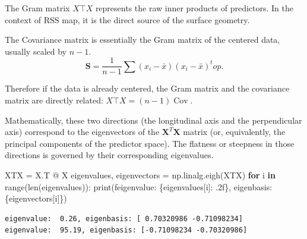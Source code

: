 \documentclass[
  letterpaper,
  DIV=11,
  numbers=noendperiod]{scrreprt}
\newenvironment{Shaded}{\begin{snugshade}}{\end{snugshade}}
\newcommand{\BuiltInTok}[1]{\textcolor[rgb]{0.00,0.23,0.31}{#1}}
\newcommand{\ControlFlowTok}[1]{\textcolor[rgb]{0.00,0.23,0.31}{\textbf{#1}}}
\newcommand{\KeywordTok}[1]{\textcolor[rgb]{0.00,0.23,0.31}{\textbf{#1}}}
\newcommand{\NormalTok}[1]{\textcolor[rgb]{0.00,0.23,0.31}{#1}}
\newcommand{\OperatorTok}[1]{\textcolor[rgb]{0.37,0.37,0.37}{#1}}
\newcommand{\SpecialCharTok}[1]{\textcolor[rgb]{0.37,0.37,0.37}{#1}}
\newcommand{\SpecialStringTok}[1]{\textcolor[rgb]{0.13,0.47,0.30}{#1}}
\newcommand{\rss}{\mathrm{RSS}}
\newcommand{\Cov}{\operatorname{Cov}}
\theoremstyle{definition}
\theoremstyle{definition}
\theoremstyle{plain}
\theoremstyle{plain}
\theoremstyle{remark}
\begin{document}
\begin{tcolorbox}[enhanced jigsaw, arc=.35mm, bottomrule=.15mm, bottomtitle=1mm, breakable, colback=white, colbacktitle=quarto-callout-note-color!10!white, colframe=quarto-callout-note-color-frame, coltitle=black, left=2mm, leftrule=.75mm, opacityback=0, opacitybacktitle=0.6, rightrule=.15mm, title=\textcolor{quarto-callout-note-color}{\faInfo}\hspace{0.5em}{Gram matrix and Covariance matrix}, titlerule=0mm, toprule=.15mm, toptitle=1mm]

The Gram matrix \(X\top X\) represents the raw inner products of
predictors. In the context of \(\rss\) map, it is the direct source of
the surface geometry.

The Covariance matrix is essentially the Gram matrix of the centered
data, usually scaled by \(n-1\). \[
\mathbf{S} = \frac{1}{n-1} \sum (x_i - \bar{x})(x_i - \bar{x})^top.
\]

Therefore if the data is already centered, the Gram matrix and the
covariance matrix are directly related: \(X\top X=(n-1)\Cov\).

Mathematically, these two directions (the longitudinal axis and the
perpendicular axis) correspond to the eigenvectors of the
\(\mathbf{X}^T\mathbf{X}\) matrix (or, equivalently, the principal
components of the predictor space). The flatness or steepness in those
directions is governed by their corresponding eigenvalues.

\begin{Shaded}
\begin{Highlighting}[]
\NormalTok{XTX }\OperatorTok{=}\NormalTok{ X.T }\OperatorTok{@}\NormalTok{ X}
\NormalTok{eigenvalues, eigenvectors }\OperatorTok{=}\NormalTok{ np.linalg.eigh(XTX)}
\ControlFlowTok{for}\NormalTok{ i }\KeywordTok{in} \BuiltInTok{range}\NormalTok{(}\BuiltInTok{len}\NormalTok{(eigenvalues)):}
    \BuiltInTok{print}\NormalTok{(}\SpecialStringTok{f\textquotesingle{}eigenvalue: }\SpecialCharTok{\{}\NormalTok{eigenvalues[i]}\SpecialCharTok{: .2f\}}\SpecialStringTok{, eigenbasis: }\SpecialCharTok{\{}\NormalTok{eigenvectors[i]}\SpecialCharTok{\}}\SpecialStringTok{\textquotesingle{}}\NormalTok{)}
\end{Highlighting}
\end{Shaded}

\begin{verbatim}
eigenvalue:  0.26, eigenbasis: [ 0.70320986 -0.71098234]
eigenvalue:  95.19, eigenbasis: [-0.71098234 -0.70320986]
\end{verbatim}


\end{tcolorbox}
\end{document}
